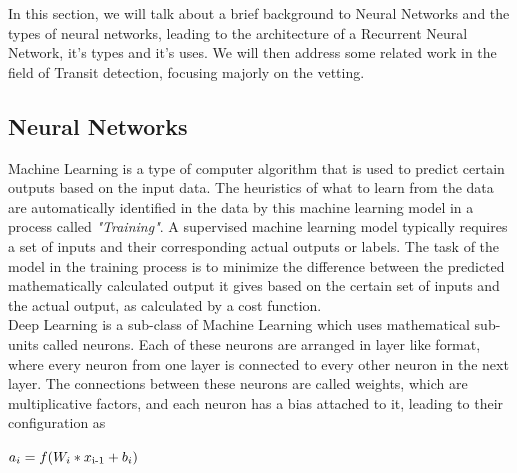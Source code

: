 




In this section, we will talk about a brief background to Neural Networks and the types of neural networks, leading to the architecture of a Recurrent Neural Network, it's types and it's uses. We will then address some related work in the field of Transit detection, focusing majorly on the vetting. 
\subsection{Neural Networks}
Machine Learning is a type of computer algorithm that is used to predict certain outputs based on the input data. The heuristics of what to learn from the data are automatically identified in the data by this machine learning model in a process called \emph{"Training"}. A supervised machine learning model typically requires a set of inputs and their corresponding actual outputs or labels. The task of the model in the training process is to minimize the difference between the predicted mathematically calculated output it gives based on the certain set of inputs and the actual output, as calculated by a cost function.\\

Deep Learning is a sub-class of Machine Learning which uses mathematical sub-units called neurons. Each of these neurons are arranged in layer like format, where every neuron from one layer is connected to every other neuron in the next layer. The connections between these neurons are called weights, which are multiplicative factors, and each neuron has a bias attached to it, leading to their configuration as
\begin{center}
$a_i = f(W_i * x\textsubscript{i-1} + b_i)$
\end{center}

